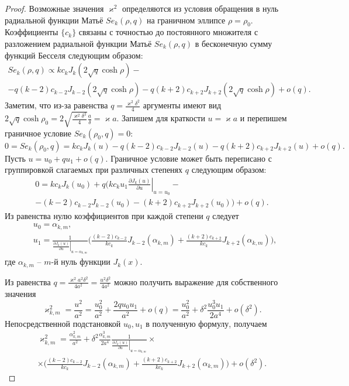 \begin{proof}
Возможные значения $\varkappa^2$ определяются из условия обращения в нуль радиальной функции Матьё $Se_k(\rho, q)$ на граничном эллипсе $\rho = \rho_0$.
Коэффициенты $\{c_k\}$ связаны \cite{wref2} с точностью до постоянного множителя с разложением радиальной функции Матьё $Se_k(\rho, q)$ в бесконечную сумму функций Бесселя следующим образом:
\begin{multline*}
Se_k(\rho, q) \propto 
	k c_k J_k(2\sqrt{q}\cosh{\rho}) - \\
	- q (k-2) c_{k-2} J_{k-2}(2\sqrt{q}\cosh{\rho}) -
	q (k+2) c_{k+2} J_{k+2}(2\sqrt{q}\cosh{\rho}) + o(q).
\end{multline*}
Заметим, что из-за равенства $q = \frac{\varkappa^2\delta^2}{4}$ аргументы имеют вид $2 \sqrt{q} \cosh{\rho_0} = 2 \sqrt{\frac{\varkappa^2 \delta^2}{4}} \frac{a}{\delta} = \varkappa a$. 
Запишем для краткости $u = \varkappa a$ и перепишем граничное условие $Se_k(\rho_0, q) = 0$:
$$0 = Se_k(\rho_0, q) =
	k c_k J_k(u) 
	- q (k-2) c_{k-2} J_{k-2}(u) -
	q (k+2) c_{k+2} J_{k+2}(u) + o(q).$$
Пусть $u = u_0 + q u_1 + o(q)$. Граничное условие может быть переписано с группировкой слагаемых при различных степенях $q$ следующим образом:
\begin{multline*}
0 =
	k c_k J_k(u_0) + q \biggl(
	k c_k u_1 \left.\frac{\partial  J_k(u)}{\partial u}\right|_{u=u_0} -\\
	-  (k-2) c_{k-2} J_{k-2}(u_0) - (k+2) c_{k+2} J_{k+2}(u_0) 
	\biggr)+ o(q).
\end{multline*}
Из равенства нулю коэффициентов при каждой степени $q$ следует
\begin{align*}
&u_0 = \alpha_{k, m}, \\
&u_1 = \frac{1}{\left.\frac{\partial J_{k} (u)}{\partial u}\right|_{u=\alpha_{k, m}}} 
\biggl(
\frac{(k-2)c_{k-2}}{k c_k} J_{k-2}(\alpha_{k, m}) + \frac{(k+2)c_{k+2} }{k c_k} J_{k+2}(\alpha_{k, m})
\biggr),
\end{align*}
где $\alpha_{k, m}$ -- $m$-й нуль функции $J_k(x)$.  

Из равенства $q=\frac{\varkappa^2 a^2 \delta^2}{4 a^2}=\frac{u^2 \delta^2}{4a^2}$ можно получить выражение для собственного значения
$$\varkappa_{k, m}^2 = \frac{u^2}{a^2} = \frac{u_0^2}{a^2} + \frac{2 q u_0 u_1}{a^2} + o(q)= \frac{u_0^2}{a^2} +  \delta^2 \frac{u_0^3 u_1}{2 a^4} + o(\delta^2).$$ 
Непосредственной подстановкой $u_0, u_1$ в полученную формулу, получаем
\begin{multline*}
\varkappa_{k, m}^2 = 
\frac{\alpha_{k, m}^2}{a^2} +  \delta^2 \frac{\alpha_{k, m}^3}{2 a^4}\frac{1}{\left.\frac{\partial J_{k} (u)}{\partial u}\right|_{u=\alpha_{k, m}}} \times \\ \times
\biggl(
\frac{(k-2)c_{k-2}}{k c_k} J_{k-2}(\alpha_{k, m}) + \frac{(k+2)c_{k+2} }{k c_k} J_{k+2}(\alpha_{k, m})
\biggr) + o(\delta^2).
\end{multline*}
\end{proof}

